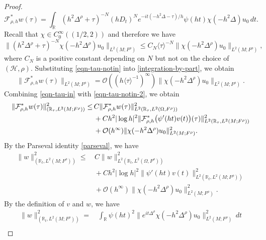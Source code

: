 \documentclass[11pt,oneside,reqno]{amsart}
\newcommand\R{\ensuremath{\mathbb{R}}}
\theoremstyle{definition}
\numberwithin{equation}{section}
\theoremstyle{plain}
\begin{document}
\begin{proof}
\begin{equation}
            \mathcal{F}_{\rho,h}^*w(\tau)= \int_\R (h^2\Delta^\rho+\tau)^{-N}(hD_t)^N e^{-it(-h^2\Delta-\tau)/h} \psi(ht)\chi(-h^2\Delta)u_0\,d t.\label{integration-by-part}
    \end{equation}
    Recall that $\chi \in C_0^\infty ((1/2,2))$ and therefore we have
    \begin{equation}
        \| (h^2\Delta^\rho+\tau)^{-N}\chi(-h^2\Delta^\rho) u_0\|_{L^2(M;F^\rho)}\le C_{N}\langle \tau \rangle^{-N} \|\chi(-h^2\Delta^\rho)u_0 \|_{L^2(M;F^\rho)},\label{eqn-tau-notin}
    \end{equation}
    where $C_{N}$ is a positive constant depending on $N$ but not on the choice of $(\mathcal{H},\rho)$. Substituting \eqref{eqn-tau-notin} into \eqref{integration-by-part}, we obtain
    \begin{equation}
        \|\mathcal{F}_{\rho,h}^* w(\tau)\|_{L^2(M;F^\rho)}=\mathcal{O}((h\langle \tau\rangle^{-1})^\infty)\| \chi(-h^2\Delta^\rho)u_0 \|_{L^2(M;F^\rho)}.\label{eqn-tau-notin-2}
    \end{equation}
    Combining \eqref{eqn-tau-in} with \eqref{eqn-tau-notin-2}, we obtain
    \begin{align}
        \| \mathcal{F}_{\rho,h}^*w(\tau) \|^2_{(\R_\tau,L^2(M;F^\rho))}\le&\, C\|\mathcal{F}_{\rho,h}^* w(\tau)\|^2_{L^2(\R_\tau,L^2(\Omega,F^\rho))}\label{last-two-term}\\ 
        &\,+Ch^2|\log h|^2\| \mathcal{F}_{\rho, h}^*\bigl( \psi'(ht)v(t) \bigr)(\tau)   \|^2_{L^2(\R_\tau, L^2(M;F^\rho))}\notag\\ 
        &\,+ \mathcal{O}(h^\infty)\| \chi(-h^2\Delta^\rho)u_0 \|^2_{L^2(M;F^\rho)}.\notag
    \end{align}
    By the Parseval identity \eqref{parseval}, we have
    \begin{equation*}
        \begin{aligned}
            \| w \|^2_{(\R_t,L^2(M;F^\rho))}\le&\, C\|w\|^2_{L^2(\R_t,L^2(\Omega,F^\rho))}\\
            &\,+Ch^2|\log h|^2\|  \psi'(ht)v(t)   \|^2_{L^2(\R_t, L^2(M;F^\rho))}\\
            &\,+ \mathcal{O}(h^\infty)\| \chi(-h^2\Delta^\rho)u_0 \|^2_{L^2(M;F^\rho)}.
        \end{aligned}
    \end{equation*}
    By the definition of $v$ and $w$, we have
    \begin{equation*}
        \begin{aligned}
            \|w\|^2_{(\R_t,L^2(M;F^\rho))}=&\,\int_\R \psi(ht)^2\|e^{it\Delta^\rho}\chi(-h^2\Delta^\rho)u_0\|^2_{L^2(M;F^\rho)}\,d t\\

\end{aligned}
\end{equation*}
\end{proof}
\end{document}
